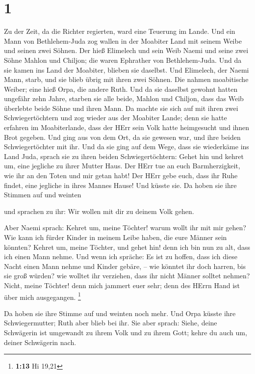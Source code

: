 \hypertarget{section}{%
\section{1}\label{section}}

 Zu der Zeit, da die Richter regierten, ward eine Teuerung
im Lande. Und ein Mann von Bethlehem-Juda zog wallen in der Moabiter
Land mit seinem Weibe und seinen zwei Söhnen.  Der hieß
Elimelech und sein Weib Naemi und seine zwei Söhne Mahlon und Chiljon;
die waren Ephrather von Bethlehem-Juda. Und da sie kamen ins Land der
Moabiter, blieben sie daselbst.  Und Elimelech, der Naemi
Mann, starb, und sie blieb übrig mit ihren zwei Söhnen.  Die
nahmen moabitische Weiber; eine hieß Orpa, die andere Ruth. Und da sie
daselbst gewohnt hatten ungefähr zehn Jahre,  starben sie
alle beide, Mahlon und Chiljon, dass das Weib überlebte beide Söhne und
ihren Mann.  Da machte sie sich auf mit ihren zwei
Schwiegertöchtern und zog wieder aus der Moabiter Lande; denn sie hatte
erfahren im Moabiterlande, dass der HErr sein Volk hatte heimgesucht und
ihnen Brot gegeben.  Und ging aus von dem Ort, da sie
gewesen war, und ihre beiden Schwiegertöchter mit ihr. Und da sie ging
auf dem Wege, dass sie wiederkäme ins Land Juda,  sprach sie
zu ihren beiden Schwiegertöchtern: Gehet hin und kehret um, eine
jegliche zu ihrer Mutter Haus. Der HErr tue an euch Barmherzigkeit, wie
ihr an den Toten und mir getan habt!  Der HErr gebe euch,
dass ihr Ruhe findet, eine jegliche in ihres Mannes Hause! Und küsste
sie. Da hoben sie ihre Stimmen auf und weinten

 und sprachen zu ihr: Wir wollen mit dir zu deinem Volk
gehen.

 Aber Naemi sprach: Kehret um, meine Töchter! warum wollt
ihr mit mir gehen? Wie kann ich fürder Kinder in meinem Leibe haben, die
eure Männer sein könnten?  Kehret um, meine Töchter, und
gehet hin! denn ich bin nun zu alt, dass ich einen Mann nehme. Und wenn
ich spräche: Es ist zu hoffen, dass ich diese Nacht einen Mann nehme und
Kinder gebäre, --  wie könntet ihr doch harren, bis sie
groß würden? wie wolltet ihr verziehen, dass ihr nicht Männer solltet
nehmen? Nicht, meine Töchter! denn mich jammert euer sehr; denn des
HErrn Hand ist über mich ausgegangen. \footnote{\textbf{1:13} Hi 19,21}

 Da hoben sie ihre Stimme auf und weinten noch mehr. Und
Orpa küsste ihre Schwiegermutter; Ruth aber blieb bei ihr. 
Sie aber sprach: Siehe, deine Schwägerin ist umgewandt zu ihrem Volk und
zu ihrem Gott; kehre du auch um, deiner Schwägerin nach.

